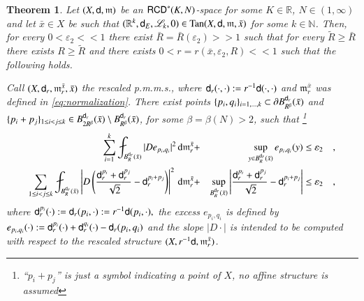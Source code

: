 \documentclass[11pt,reqno]{amsart}
\newcommand{\mm}{\mathfrak m}
\newcommand{\sfd}{{\sf d}}
\newcommand{\LL}{\mathscr{L}}
\renewcommand{\d}{{\rm{d}}}
\newcommand{\R}{\mathbb{R}}
\newcommand{\N}{\mathbb{N}}
\newcommand{\Tan}{{\rm Tan}}
\newcommand{\RCD}{{\sf RCD}}
\newcommand{\vare}{\varepsilon}
\newtheorem{theorem}{Theorem}[section]
\theoremstyle{definition}
\theoremstyle{remark}
\theoremstyle{remark}
\theoremstyle{remark}
\theoremstyle{remark}
\theoremstyle{remark}
\theoremstyle{remark}
\theoremstyle{remark}
\begin{document}
 \begin{theorem}\label{lem:ConstrU}
Let $(X,\sfd,\mm)$ be an $\RCD^*(K,N)$-space for some  $K \in \R$, $N \in (1,\infty)$ and let $\bar{x} \in X$ be such that  $(\R^k,\sfd_{E},\LL_k,0) \in \Tan(X,\sfd,\mm,\bar{x})$ for some $k \in \N$. Then, for every  $0<\varepsilon_2<<1$ there exist $\bar{R}=\bar{R}(\vare_2)>>1$ such that for every $\tilde{R}\geq \bar{R}$ there exists $R\geq \tilde{R}$  and there exists $0<r=r(\bar x, \vare_2,R)<< 1$ such that the following holds.

Call  $(X,  \sfd_r, \mm^{\bar{x}}_r, \bar{x})$  the rescaled p.m.m.s., where $\sfd_r(\cdot,\cdot):=r^{-1} \sfd(\cdot, \cdot)$ and  $ \mm^{\bar{x}}_r$ was defined in \eqref{eq:normalization}. There exist points $\{p_i,q_i\}_{i=1,\ldots,k}\subset \partial B_{R^\beta}^{\sfd_r}(\bar{x})$ and $\{p_i+p_j\}_{1\leq i<j\leq k}\in  B_{2R^\beta}^{\sfd_r}(\bar{x})\setminus B_{R^\beta}^{\sfd_r}(\bar{x})$, for some $\beta=\beta(N)>2$, such that \footnote{``$p_i+p_j$'' is just a symbol indicating a point of $X$, no affine structure is assumed}
\begin{eqnarray}
\sum_{i=1}^k \fint _{B^{\sfd_r}_R(\bar{x})} |D e_{p_i,q_i}|^2 \, \d \mm^{\bar{x}}_r &+& \sup_{y \in B^{\sfd_r}_R(\bar{x})} e_{p_i,q_i} (y) \leq \varepsilon_2\quad, \label{eq:estUexc} \\
 \sum_{1\leq i< j\leq k} \fint_{B^{\sfd_r}_R(\bar{x})}  \left|D \left( \frac{\sfd_r^{p_i}+\sfd_r^{p_j}} {\sqrt 2} - \sfd_r^{p_i+p_j}\right) \right|^2 \, \d \mm^{\bar{x}}_r &+& \sup_{B^{\sfd_r}_R(\bar{x})}  \left| \frac{\sfd_r^{p_i}+\sfd_r^{p_j}} {\sqrt 2} - \sfd_r^{p_i+p_j}\right|   \leq \varepsilon_2\quad, \label{eq:estUdidj} 
\end{eqnarray} 
where $\sfd^{p_i}_r(\cdot):=\sfd_r(p_i, \cdot):= r^{-1}\sfd(p_i,\cdot),$ the excess $e_{p_i,q_i}$ is defined by $e_{p_i,q_i}(\cdot):=\sfd^{p_i}_r(\cdot)+\sfd^{q_i}_r(\cdot)-\sfd_r(p_i,q_i)$ and  the slope $|D\cdot|$ is intended to be computed with respect to the rescaled structure $(X, r^{-1} \sfd, \mm^{\bar{x}}_r)$.
 \end{theorem}

  
\end{document}
